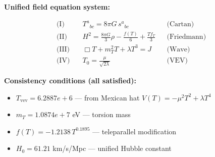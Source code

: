 
\textbf{Unified field equation system:}

\begin{align}
  \text{(I)} \quad & T^a{}_{bc} = 8\pi G \, s^a{}_{bc} && \text{(Cartan)} \\
  \text{(II)} \quad & H^2 = \frac{8\pi G}{3}\rho - \frac{f(T)}{6} + \frac{Tf_T}{3} && \text{(Friedmann)} \\
  \text{(III)} \quad & \Box T + m_T^2 T + \lambda T^3 = J && \text{(Wave)} \\
  \text{(IV)} \quad & T_0 = \frac{\mu}{\sqrt{2\lambda}} && \text{(VEV)}
\end{align}

\textbf{Consistency conditions (all satisfied):}
\begin{itemize}
  \item $T_{\text{vev}} = 6.2887e+6$ — from Mexican hat $V(T) = -\mu^2 T^2 + \lambda T^4$
  \item $m_T = 1.0874e+7$ eV — torsion mass
  \item $f(T) = -1.2138 \, T^{0.1895}$ — teleparallel modification
  \item $H_0 = 61.21$ km/s/Mpc — unified Hubble constant
\end{itemize}